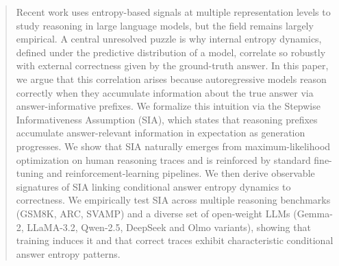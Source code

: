 \documentclass{article}
\begin{document}

\printAffiliationsAndNotice{}

\begin{abstract}
Recent work uses entropy-based signals at multiple representation levels to study reasoning in large language models, but the field remains largely empirical. A central unresolved puzzle is why internal entropy dynamics, defined under the predictive distribution of a model, correlate so robustly with external correctness given by the ground-truth answer. In this paper, we argue that this correlation arises because autoregressive models reason correctly when they accumulate information about the true answer via answer-informative prefixes. We formalize this intuition via the Stepwise Informativeness Assumption (SIA), which states that reasoning prefixes accumulate answer-relevant information in expectation as generation progresses. We show that SIA naturally emerges from maximum-likelihood optimization on human reasoning traces and is reinforced by standard fine-tuning and reinforcement-learning pipelines. We then derive observable signatures of SIA linking conditional answer entropy dynamics to correctness. We empirically test SIA across multiple reasoning benchmarks (GSM8K, ARC, SVAMP) and a diverse set of open-weight LLMs (Gemma-2, LLaMA-3.2, Qwen-2.5, DeepSeek and Olmo variants), showing that training induces it and that correct traces exhibit characteristic conditional answer entropy patterns.
\end{abstract}
\end{document}
